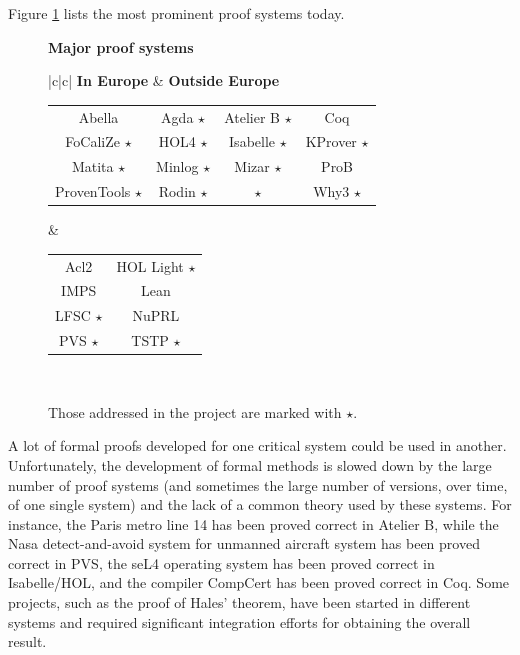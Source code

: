 Figure \ref{systems} lists the most prominent proof systems today.

\newcommand\s{ $\star$}
\begin{figure}[ht]
  \begin{shaded}
    \begin{center}
      {\bf \Large Major proof systems}\\[5mm]
      \begin{tabular}{|c|c|}\hline
       {\bf In Europe} & {\bf Outside Europe}\\\hline
        \begin{minipage}{10cm}
          \begin{tabular}{cccc}
            Abella & Agda\s & Atelier B\s & Coq\\
            FoCaliZe\s & HOL4\s & Isabelle\s & KProver\s\\
            Matita\s & Minlog\s & Mizar\s & ProB\\
            ProvenTools\s & Rodin\s & \tlaplus\s & Why3\s\\
          \end{tabular}
        \end{minipage}
        &\begin{minipage}{4cm}
           \begin{tabular}{cc}
             Acl2 & HOL Light\s\\
             IMPS & Lean\\
             LFSC\s & NuPRL\\
             PVS\s & TSTP\s
           \end{tabular}
         \end{minipage}\\\hline
      \end{tabular}
    \end{center}
    \vspace{-5mm}
    \caption{Those addressed in the project are marked with $\star$.\label{systems}}
  \end{shaded}
\end{figure}


A lot of formal proofs developed for one critical system could be used
in another.  Unfortunately, the development of formal methods is
slowed down by the large number of proof systems (and sometimes the
large number of versions, over time, of one single system) and the
lack of a common theory used by these systems.  For instance, the
Paris metro line 14 has been proved correct in Atelier B, while the
Nasa detect-and-avoid system for unmanned aircraft system has been
proved correct in PVS, the seL4 operating system has been proved
correct in Isabelle/HOL\cite{paulson700}, and the compiler CompCert
has been proved correct in Coq.  Some projects, such as the proof of
Hales' theorem, have been started in different systems and required
significant integration efforts for obtaining the overall result.

